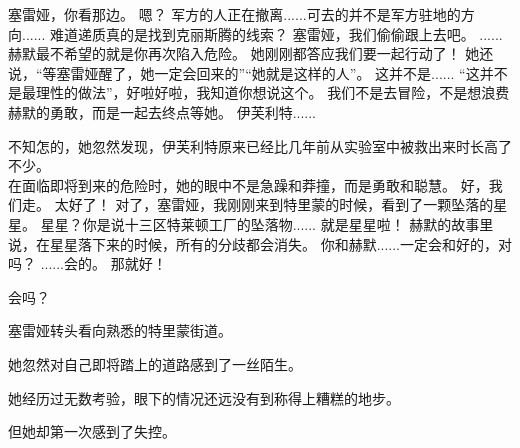 \documentclass[openany]{book}
\begin{document}
\begin{dialogue}
     塞雷娅，你看那边。
     嗯？
     军方的人正在撤离......可去的并不是军方驻地的方向......
     难道递质真的是找到克丽斯腾的线索？
     塞雷娅，我们偷偷跟上去吧。
     ......赫默最不希望的就是你再次陷入危险。
     她刚刚都答应我们要一起行动了！
     她还说，“等塞雷娅醒了，她一定会回来的”“她就是这样的人”。
     这并不是......
     “这并不是最理性的做法”，好啦好啦，我知道你想说这个。
     我们不是去冒险，不是想浪费赫默的勇敢，而是一起去终点等她。
     伊芙利特......\par
    不知怎的，她忽然发现，伊芙利特原来已经比几年前从实验室中被救出来时长高了不少。\\
    在面临即将到来的危险时，她的眼中不是急躁和莽撞，而是勇敢和聪慧。
     好，我们走。
     太好了！
     对了，塞雷娅，我刚刚来到特里蒙的时候，看到了一颗坠落的星星。
     星星？你是说十三区特莱顿工厂的坠落物......
     就是星星啦！
     赫默的故事里说，在星星落下来的时候，所有的分歧都会消失。
     你和赫默......一定会和好的，对吗？
     ......会的。
     那就好！
\end{dialogue}

\par
会吗？\par
塞雷娅转头看向熟悉的特里蒙街道。\par
她忽然对自己即将踏上的道路感到了一丝陌生。\par
她经历过无数考验，眼下的情况还远没有到称得上糟糕的地步。\par
但她却第一次感到了失控。\par
\end{document}
